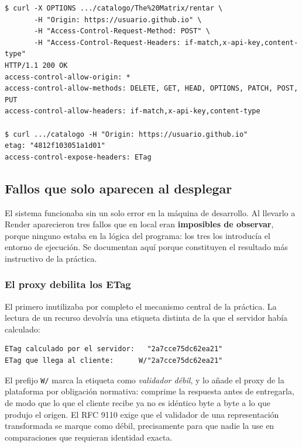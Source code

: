 \documentclass[12pt]{article}
\begin{document}
\begin{lstlisting}[style=traza,caption={Verificación de CORS desde otro origen}]
$ curl -X OPTIONS .../catalogo/The%20Matrix/rentar \
       -H "Origin: https://usuario.github.io" \
       -H "Access-Control-Request-Method: POST" \
       -H "Access-Control-Request-Headers: if-match,x-api-key,content-type"
HTTP/1.1 200 OK
access-control-allow-origin: *
access-control-allow-methods: DELETE, GET, HEAD, OPTIONS, PATCH, POST, PUT
access-control-allow-headers: if-match,x-api-key,content-type

$ curl .../catalogo -H "Origin: https://usuario.github.io"
etag: "4812f103051a1d01"
access-control-expose-headers: ETag
\end{lstlisting}

\subsection{Fallos que solo aparecen al desplegar}

El sistema funcionaba sin un solo error en la máquina de desarrollo. Al llevarlo a Render aparecieron tres fallos que en local eran \textbf{imposibles de observar}, porque ninguno estaba en la lógica del programa: los tres los introducía el entorno de ejecución. Se documentan aquí porque constituyen el resultado más instructivo de la práctica.

\subsubsection*{El proxy debilita los ETag}

El primero inutilizaba por completo el mecanismo central de la práctica. La lectura de un recurso devolvía una etiqueta distinta de la que el servidor había calculado:

\begin{lstlisting}[style=traza,caption={La etiqueta que recibe el cliente no es la que emite el servidor}]
ETag calculado por el servidor:   "2a7cce75dc62ea21"
ETag que llega al cliente:      W/"2a7cce75dc62ea21"
\end{lstlisting}

El prefijo \texttt{W/} marca la etiqueta como \textit{validador débil}, y lo añade el proxy de la plataforma por obligación normativa: comprime la respuesta antes de entregarla, de modo que lo que el cliente recibe ya no es idéntico byte a byte a lo que produjo el origen. El RFC 9110 exige que el validador de una representación transformada se marque como débil, precisamente para que nadie la use en comparaciones que requieran identidad exacta.
\end{document}
